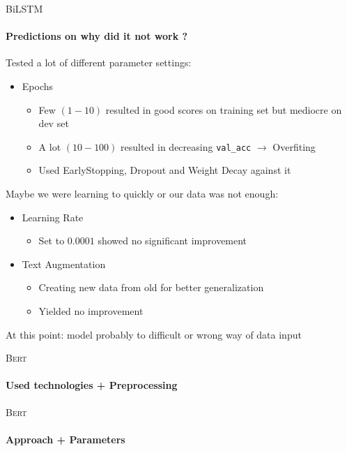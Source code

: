 \documentclass[english,handout]{mlutalk}
\newcommand{\Bert}{\textsc{Bert}\xspace}
\begin{document}
\begin{frame}{BiLSTM}
  \framesubtitle{Predictions on why did it not work ?}
    
  Tested a lot of different parameter settings:
  \begin{itemize}
    \item Epochs
    \begin{itemize}
      \item Few $(1-10)$ resulted in good scores on training set but mediocre on dev set
      \item A lot $(10-100)$ resulted in decreasing \texttt{val\_acc} $\rightarrow$ Overfiting
      \item Used EarlyStopping, Dropout and Weight Decay against it
    \end{itemize}
  \end{itemize}
  Maybe we were learning to quickly or our data was not enough:
  \begin{itemize}
    \item Learning Rate 
    \begin{itemize}
      \item Set to $0.0001$ showed no significant improvement
    \end{itemize}
    \item Text Augmentation
    \begin{itemize}
      \item Creating new data from old for better generalization
      \item Yielded no improvement
    \end{itemize}
  \end{itemize}

  At this point: model probably to difficult or wrong way of data input

\end{frame}

\begin{frame}{\Bert}
  \framesubtitle{Used technologies + Preprocessing}
  

\end{frame}

\begin{frame}{\Bert}
  \framesubtitle{Approach + Parameters}
  

\end{frame}

\end{document}

